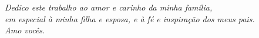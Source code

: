 \begin{dedicatoria}
   \vspace*{\fill}
   \centering
   \noindent
   \textit{ Dedico este trabalho ao amor e carinho da minha família,\\
   	em especial à minha filha e esposa, e à fé e inspiração dos meus pais.\\
   	Amo vocês.} \vspace*{\fill}
\end{dedicatoria}
